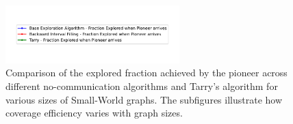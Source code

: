 \begin{figure}[H]
    \centering
    \qquad
    \qquad
    \includegraphics[width=0.6\textwidth]{Cap3/no_comm_fraction_legend.pdf}
    \newline
    \qquad
    \newline
    \qquad
    \caption{Comparison of the explored fraction achieved by the pioneer across different no-communication algorithms and Tarry's algorithm for various sizes of Small-World graphs. The subfigures illustrate how coverage efficiency varies with graph sizes.}
    \label{fig_no_comm_fraction_all_sizes_sw}
\end{figure}


